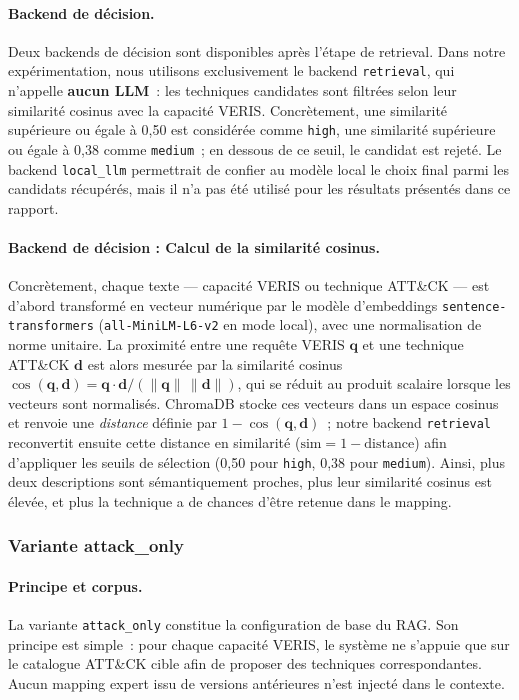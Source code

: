 \documentclass[a4paper,12pt]{article}
\begin{document}
\paragraph{Backend de décision.}
Deux backends de décision sont disponibles après l'étape de retrieval.
Dans notre expérimentation, nous utilisons exclusivement le backend
\texttt{retrieval}, qui n'appelle \textbf{aucun LLM}~: les techniques
candidates sont filtrées selon leur similarité cosinus avec la capacité
VERIS. Concrètement, une similarité supérieure ou égale à 0{,}50 est
considérée comme \texttt{high}, une similarité supérieure ou égale à
0{,}38 comme \texttt{medium}~; en dessous de ce seuil, le candidat est
rejeté. Le backend \texttt{local\_llm} permettrait de confier au modèle
local le choix final parmi les candidats récupérés, mais il n'a pas été
utilisé pour les résultats présentés dans ce rapport.

\paragraph{Backend de décision : Calcul de la similarité cosinus.}
Concrètement, chaque texte --- capacité VERIS ou technique ATT\&CK --- est
d'abord transformé en vecteur numérique par le modèle d'embeddings
\texttt{sentence-transformers} (\texttt{all-MiniLM-L6-v2} en mode local), avec
une normalisation de norme unitaire. La proximité entre une requête VERIS
$\mathbf{q}$ et une technique ATT\&CK $\mathbf{d}$ est alors mesurée par la
similarité cosinus
$\cos(\mathbf{q},\mathbf{d})=\mathbf{q}\cdot\mathbf{d}/(\|\mathbf{q}\|\,\|\mathbf{d}\|)$,
qui se réduit au produit scalaire lorsque les vecteurs sont normalisés.
ChromaDB stocke ces vecteurs dans un espace cosinus et renvoie une
\emph{distance} définie par $1-\cos(\mathbf{q},\mathbf{d})$~; notre backend
\texttt{retrieval} reconvertit ensuite cette distance en similarité
($\mathrm{sim}=1-\mathrm{distance}$) afin d'appliquer les seuils de sélection
(0{,}50 pour \texttt{high}, 0{,}38 pour \texttt{medium}). Ainsi, plus deux
descriptions sont sémantiquement proches, plus leur similarité cosinus est
élevée, et plus la technique a de chances d'être retenue dans le mapping.

\subsubsection{Variante attack\_only}

\paragraph{Principe et corpus.}
La variante \texttt{attack\_only} constitue la configuration de base du RAG.
Son principe est simple~: pour chaque capacité VERIS, le système ne s'appuie
que sur le catalogue ATT\&CK cible afin de proposer des techniques
correspondantes. Aucun mapping expert issu de versions antérieures n'est
injecté dans le contexte.
\end{document}
